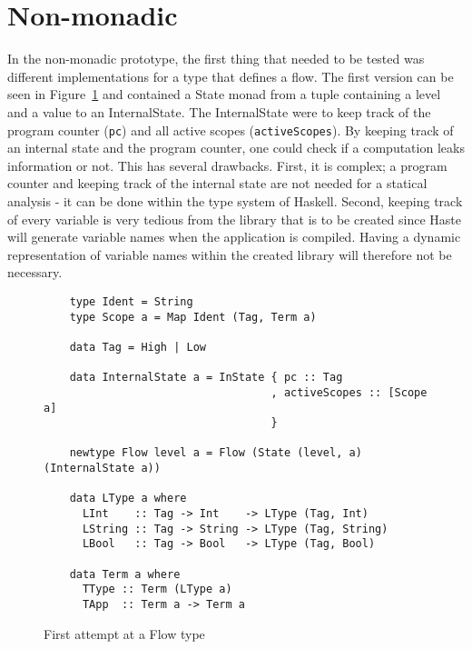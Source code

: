 \section{Non-monadic}
In the non-monadic prototype, the first thing that needed to be tested was different implementations for a type that defines a flow. The first version can be seen in Figure~\ref{fig:first_flow} and contained a State monad from a tuple containing a level and a value to an InternalState. The InternalState were to keep track of the program counter ({\tt pc}) and all active scopes ({\tt activeScopes}). By keeping track of an internal state and the program counter, one could check if a computation leaks information or not. This has several drawbacks. First, it is complex; a program counter and keeping track of the internal state are not needed for a statical analysis - it can be done within the type system of Haskell. Second, keeping track of every variable is very tedious from the library that is to be created since Haste will generate variable names when the application is compiled. Having a dynamic representation of variable names within the created library will therefore not be necessary.
\begin{figure}[h]
  \begin{verbatim}
    type Ident = String
    type Scope a = Map Ident (Tag, Term a)

    data Tag = High | Low
    
    data InternalState a = InState { pc :: Tag
                                   , activeScopes :: [Scope a]
                                   }

    newtype Flow level a = Flow (State (level, a) (InternalState a))

    data LType a where
      LInt    :: Tag -> Int    -> LType (Tag, Int)
      LString :: Tag -> String -> LType (Tag, String)
      LBool   :: Tag -> Bool   -> LType (Tag, Bool)

    data Term a where
      TType :: Term (LType a)
      TApp  :: Term a -> Term a

  \end{verbatim}
  \caption{First attempt at a Flow type}
  \label{fig:first_flow}
\end{figure}


